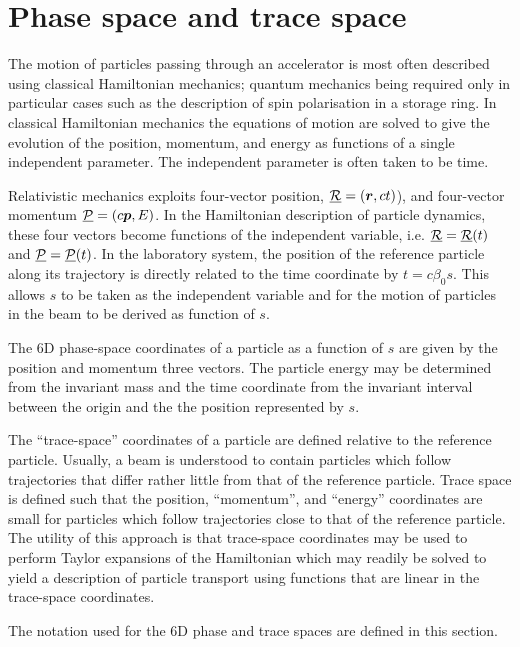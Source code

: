 \graphicspath{ {03-PhaseTraceSpace/Figures/} }

\section{Phase space and trace space}

The motion of particles passing through an accelerator is most often
described using classical Hamiltonian mechanics; quantum mechanics
being required only in particular cases such as the description of
spin polarisation in a storage ring.
In classical Hamiltonian mechanics the equations of motion are solved
to give the evolution of the position, momentum, and energy as
functions of a single independent parameter.
The independent parameter is often taken to be time.

Relativistic mechanics exploits four-vector position,
$\underline{\cal{R}} = (\bm{r}, ct)$), and four-vector momentum  
$\underline{\cal{P}} = (c\bm{p}, E)$.
In the Hamiltonian description of particle dynamics, these four
vectors become functions of the independent variable, i.e.
$\underline{\cal{R}} = \underline{\cal{R}}(t)$ and
$\underline{\cal{P}} = \underline{\cal{P}}(t)$.
In the laboratory system, the position of the reference particle along
its trajectory is directly related to the time coordinate by
$t = c \beta_0 s$.
This allows $s$ to be taken as the independent variable and for the
motion of particles in the beam to be derived as function of $s$.

The 6D phase-space coordinates of a particle as a function of $s$ are
given by the position and momentum three vectors.
The particle energy may be determined from the invariant mass and the
time coordinate from the invariant interval between the origin and the
the position represented by $s$.

The ``trace-space'' coordinates of a particle are defined relative to
the reference particle.
Usually, a beam is understood to contain particles which follow
trajectories that differ rather little from that of the reference
particle.
Trace space is defined such that the position, ``momentum'', and
``energy'' coordinates are small for particles which follow
trajectories close to that of the reference particle.
The utility of this approach is that trace-space coordinates may be
used to perform Taylor expansions of the Hamiltonian which may readily
be solved to yield a description of particle transport using functions
that are linear in the trace-space coordinates.

The notation used for the 6D phase and trace spaces are defined in
this section.

